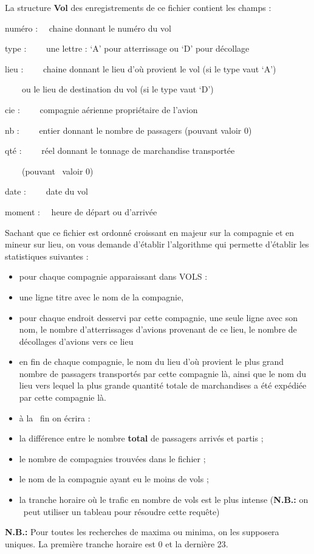 {
La structure \textbf{Vol} des enregistrements de ce fichier contient les
champs : }

{
numéro : \ \ chaine donnant le numéro du vol}

{
type  : \ \ \ \ une lettre : ‘A’ pour atterrissage ou ‘D’ pour
décollage}

{
lieu : \ \ \ \ chaine donnant le lieu d’où provient le vol (si le type
vaut ‘A’) }

{
\ \ \ \ ou le lieu de destination du vol (si le type vaut ‘D’)}

{
cie : \ \ \ \ compagnie aérienne propriétaire de l’avion}

{
nb : \ \ \ \ entier donnant le nombre de passagers (pouvant valoir 0)}

{
qté : \ \ \ \ réel donnant le tonnage de marchandise transportée }

{
\ \ \ \ (pouvant \ valoir 0)}

{
date : \ \ \ \ date du vol}

{
moment : \ \ heure de départ ou d’arrivée}

{
Sachant que ce fichier est ordonné croissant en majeur sur la compagnie
et en mineur sur lieu, on vous demande d’établir l’algorithme qui
permette d’établir les statistiques suivantes :}

\liststyleListv
\begin{itemize}
\item {
pour chaque compagnie apparaissant dans VOLS :}
\item {
une ligne titre avec le nom de la compagnie,}
\item {
pour chaque endroit desservi par cette compagnie, une seule ligne avec
son nom, le nombre d’atterrissages d’avions provenant de ce lieu, le
nombre de décollages d’avions vers ce lieu\ \ }
\item {
en fin de chaque compagnie, le nom du lieu d’où provient le plus grand
nombre de passagers transportés par cette compagnie là, ainsi que le
nom du lieu vers lequel la plus grande quantité totale de marchandises
a été expédiée par cette compagnie là.}
\end{itemize}

\bigskip


\bigskip

\liststyleListv
\begin{itemize}
\item {
à la \ fin on écrira : }
\item {
la différence entre le nombre \textbf{total} de passagers arrivés et
partis ;}
\item {
le nombre de compagnies trouvées dans le fichier ;}
\item {
le nom de la compagnie ayant eu le moins de vols ;}
\item {
la tranche horaire où le trafic en nombre de vols est le plus intense
(\textbf{N.B.:} on \ peut utiliser un tableau pour résoudre cette
requête)}
\end{itemize}
{
\textbf{N.B.:} Pour toutes les recherches de maxima ou minima, on les
supposera uniques. La première tranche horaire est 0 et la dernière 23.
}

